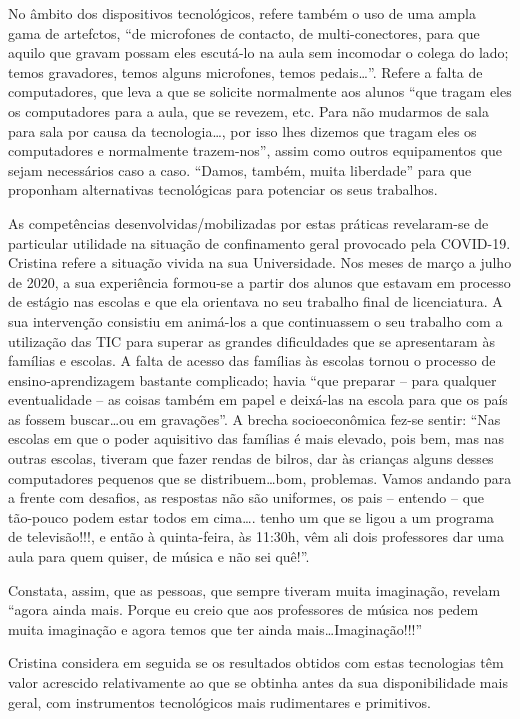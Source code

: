 \documentclass{textolivre}
\begin{document}
No âmbito dos dispositivos tecnológicos, refere também o uso de uma ampla gama
de artefctos, “de microfones de contacto, de multi-conectores, para que aquilo
que gravam possam eles escutá-lo na aula sem incomodar o colega do lado; temos
gravadores, temos alguns microfones, temos pedais\ldots”. Refere a falta de
computadores, que leva a que se solicite normalmente aos alunos “que tragam
eles os computadores para a aula, que se revezem, etc. Para não mudarmos de
sala para sala por causa da tecnologia\ldots, por isso lhes dizemos que tragam
eles os computadores e normalmente trazem-nos”, assim como outros equipamentos
que sejam necessários caso a caso. “Damos, também, muita liberdade” para que
proponham alternativas tecnológicas para potenciar os seus trabalhos.

As competências desenvolvidas/mobilizadas por estas práticas revelaram-se de
particular utilidade na situação de confinamento geral provocado pela COVID-19.
Cristina refere a situação vivida na sua Universidade. Nos meses de março a
julho de 2020, a sua experiência formou-se a partir dos alunos que estavam em
processo de estágio nas escolas e que ela orientava no seu trabalho final de
licenciatura. A sua intervenção consistiu em animá-los a que continuassem o seu
trabalho com a utilização das TIC para superar as grandes dificuldades que se
apresentaram às famílias e escolas. A falta de acesso das famílias às escolas
tornou o processo de ensino-aprendizagem bastante complicado; havia “que
preparar – para qualquer eventualidade – as coisas também em papel e deixá-las
na escola para que os país as fossem buscar\ldots ou em gravações”. A brecha
socioeconômica fez-se sentir: “Nas escolas em que o poder aquisitivo das
famílias é mais elevado, pois bem, mas nas outras escolas, tiveram que fazer
rendas de bilros, dar às crianças alguns desses computadores pequenos que se
distribuem\ldots bom, problemas. Vamos andando para a frente com desafios, as
respostas não são uniformes, os pais – entendo – que tão-pouco podem estar
todos em cima\ldots. tenho um que se ligou a um programa de televisão!!!, e então à
quinta-feira, às 11:30h, vêm ali dois professores dar uma aula para quem
quiser, de música e não sei quê!”.

Constata, assim, que as pessoas, que sempre tiveram muita imaginação, revelam
“agora ainda mais. Porque eu creio que aos professores de música nos pedem
muita imaginação e agora temos que ter ainda mais\ldots Imaginação!!!”

Cristina considera em seguida se os resultados obtidos com estas tecnologias
têm valor acrescido relativamente ao que se obtinha antes da sua
disponibilidade mais geral, com instrumentos tecnológicos mais rudimentares e
primitivos.
\end{document}
